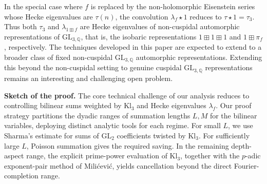 \documentclass[11pt,reqno]{amsart}
\numberwithin{equation}{section}
\theoremstyle{plain}
\theoremstyle{definition}
\begin{document}
In the special case where $f$ is replaced by the non-holomorphic Eisenstein series 
whose Hecke eigenvalues are $\tau(n)$, the convolution $\lambda_f \star 1$ 
reduces to $\tau \star 1 = \tau_3$. Thus both $\tau_3$ and $\lambda_{1\boxplus f}$ 
are Hecke eigenvalues of non-cuspidal automorphic 
representations of $\mathrm{GL}_{3,\mathbb{Q}}$, that is, the isobaric 
representations $1\boxplus 1\boxplus 1$ and $1\boxplus \pi_f$, respectively. 
The techniques developed in this paper are expected to extend to a broader class of fixed non-cuspidal $\mathrm{GL}_{3,\mathbb{Q}}$ automorphic representations.
Extending this beyond the non-cuspidal setting to genuine cuspidal $\mathrm{GL}_{3,\mathbb{Q}}$ representations remains an interesting and challenging open problem.

\medskip

\noindent\textbf{Sketch of the proof.}  
The core technical challenge of our analysis reduces to controlling bilinear sums weighted by
$\textrm{Kl}_3$ and Hecke eigenvalues $\lambda_f$.
Our proof strategy partitions the dyadic ranges of summation lengths $L,M$ for the bilinear variables, 
deploying distinct analytic tools for each regime. For small \(L\), we use Sharma's estimate for sums of
\(\mathrm{GL}_2\) coefficients twisted by \(\mathrm{Kl}_3\).
For sufficiently large \(L\), Poisson summation gives the required
saving. In the remaining depth-aspect range, the explicit
prime-power evaluation of \(\mathrm{Kl}_3\), together with the
\(p\)-adic exponent-pair method of Mili\'cevi\'c, yields cancellation
beyond the direct Fourier-completion range.
\end{document}
